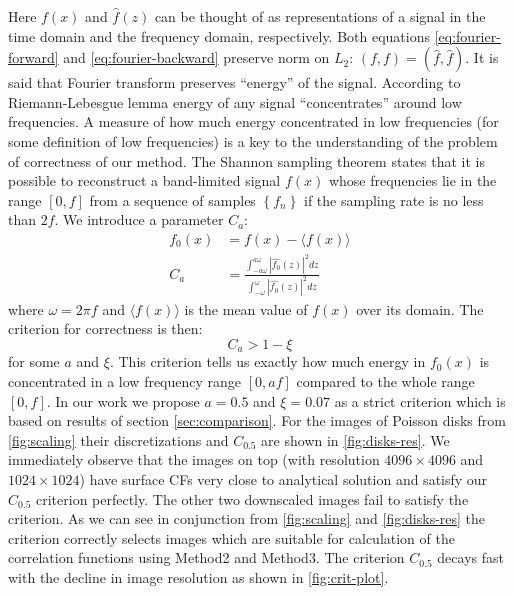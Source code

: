 \documentclass[reprint,amsmath,amssymb,aps,pre]{revtex4-1}
\begin{document}
Here $f(x)$ and $\hat{f}(z)$ can be thought of as representations of a signal in
the time domain and the frequency domain, respectively. Both equations
\cref{eq:fourier-forward} and \cref{eq:fourier-backward} preserve norm on $L_2$:
$(f, f) = (\hat{f}, \hat{f})$. It is said that Fourier transform preserves
``energy'' of the signal. According to Riemann-Lebesgue lemma \cite{bookHilb}
energy of any signal ``concentrates'' around low frequencies. A measure of how
much energy concentrated in low frequencies (for some definition of low
frequencies) is a key to the understanding of the problem of correctness of our
method. The Shannon sampling theorem \cite{bookHilb} states that it is possible
to reconstruct a band-limited signal $f(x)$ whose frequencies lie in the range
$[0, f]$ from a sequence of samples $\left\{f_n\right\}$ if the sampling rate is
no less than $2f$. We introduce a parameter $C_a$:
\begin{align*}
  f_0(x) &= f(x) - \langle f(x) \rangle \\
  C_a &= \frac{\int_{-a\omega}^{a\omega} |\hat{f_0}(z)|^2 dz}{\int_{-\omega}^{\omega} |\hat{f_0}(z)|^2 dz}
\end{align*}
where $\omega = 2\pi f$ and $\langle f(x) \rangle$ is the mean value of $f(x)$
over its domain. The criterion for correctness is then:
\begin{equation*}
  C_a > 1 - \xi
\end{equation*}
for some $a$ and $\xi$. This criterion tells us exactly how much energy in
$f_0(x)$ is concentrated in a low frequency range $[0, af]$ compared to the
whole range $[0, f]$. In our work we propose $a = 0.5$ and $\xi = 0.07$ as
a strict criterion which is based on results of section
\cref{sec:comparison}. For the images of Poisson disks from \cref{fig:scaling}
their discretizations and $C_{0.5}$ are shown in \cref{fig:disks-res}. We
immediately observe that the images on top (with resolution $4096 \times 4096$
and $1024 \times 1024$) have surface CFs very close to analytical solution and
satisfy our  $C_{0.5}$ criterion perfectly. The other two downscaled images fail
to satisfy the criterion. As we can see in conjunction from \cref{fig:scaling}
and \cref{fig:disks-res} the criterion correctly selects images which are
suitable for calculation of the correlation functions using Method2 and
Method3. The criterion $C_{0.5}$ decays fast with the decline in image
resolution as shown in \cref{fig:crit-plot}.
\end{document}
